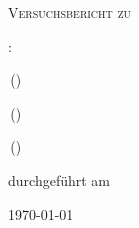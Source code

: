 
\makeatletter
\newcommand*{\protokollemailparse}[1]{%
	\@for\@tempa:=#1\do{%
		\normalsize\email{\@tempa}\\
	}%
}
\makeatother

\begin{titlepage}
	\centering
	{\scshape\LARGE Versuchsbericht zu \par}
	\vspace{1cm}
	{\scshape\huge \varNum {}: \varName\par}
	\vspace{2.5cm}
	{\LARGE \varGruppe\par}
	\vspace{0.5cm}
	{\large \varNameA \,(\varEmailA) \par}
	{\large \varNameB \,(\varEmailB) \par}
	{\large \varNameC \,(\varEmailC) \par}
	\vfill
	durchgeführt am \varDatum\par
	{\large \varBetreuer} 
	\vfill	
	{\large \today\par}
\end{titlepage}


\maketitle
